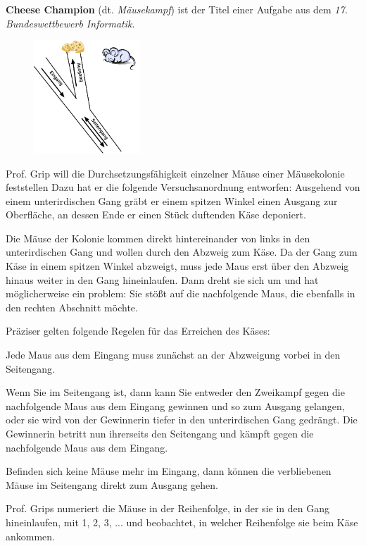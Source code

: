 \documentclass[10pt, a4paper, ngerman]{arbeitsblatt}
\begin{document}
\ReiheTitel

\textbf{Cheese Champion} (dt. \emph{Mäusekampf}) ist der Titel einer Aufgabe aus dem \emph{17. Bundeswettbewerb Informatik}.
\begin{rahmen}\small
\begin{wrapfix}
	\begin{figure}
		\includegraphics[width=4cm]{Q1-AB.II.06-Cheese_Champion.png}
	\end{figure}

	Prof. Grip will die Durchsetzungsfähigkeit einzelner Mäuse einer Mäusekolonie feststellen Dazu hat er die folgende Versuchsanordnung entworfen: Ausgehend von einem unterirdischen Gang gräbt er einem spitzen Winkel einen Ausgang zur Oberfläche, an dessen Ende er einen Stück duftenden Käse deponiert.

	Die Mäuse der Kolonie kommen direkt hintereinander von links in den unterirdischen Gang und wollen durch den Abzweig zum Käse. Da der Gang zum Käse in einem spitzen Winkel abzweigt, muss jede Maus erst über den Abzweig hinaus weiter in den Gang hineinlaufen. Dann dreht sie sich um und hat möglicherweise ein problem: Sie stößt auf die nachfolgende Maus, die ebenfalls in den rechten Abschnitt möchte.

	Präziser gelten folgende Regelen für das Erreichen des Käses:
	\begin{smallitem}
		\item Jede Maus aus dem Eingang muss zunächst an der Abzweigung vorbei in den Seitengang.
		\item Wenn Sie im Seitengang ist, dann kann Sie entweder den Zweikampf gegen die nachfolgende Maus aus dem Eingang gewinnen und so zum Ausgang gelangen, oder sie wird von der Gewinnerin tiefer in den unterirdischen Gang gedrängt. Die Gewinnerin betritt nun ihrerseits den Seitengang und kämpft gegen die nachfolgende Maus aus dem Eingang.
		\item Befinden sich keine Mäuse mehr im Eingang, dann können die verbliebenen Mäuse im Seitengang direkt zum Ausgang gehen.
	\end{smallitem}

	Prof. Grips numeriert die Mäuse in der Reihenfolge, in der sie in den Gang hineinlaufen, mit 1, 2, 3, ... und beobachtet, in welcher Reihenfolge sie beim Käse ankommen.
\end{wrapfix}
\end{rahmen}
\end{document}
